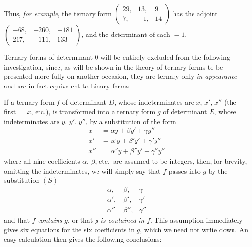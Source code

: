 Thus, \textit{for example}, the ternary form $\left(\begin{smallmatrix}29,\allowbreak &13,\allowbreak &9\\7,\allowbreak &-1,\allowbreak &14\end{smallmatrix}\right)$ has the adjoint $\left(\begin{smallmatrix}-68,\allowbreak &-260,\allowbreak &-181\\217,\allowbreak &-111,\allowbreak &133\end{smallmatrix}\right)$, and the determinant of each $=1$.

Ternary forms of determinant $0$ will be entirely excluded from the following investigation, since, as will be shown in the theory of ternary forms to be presented more fully on another occasion, they are ternary only \textit{in appearance} and are in fact equivalent to binary forms.

If a ternary form $f$ of determinant $D$, whose indeterminates are $x$, $x'$, $x''$ (the first $=x$, etc.), is transformed into a ternary form $g$ of determinant $E$, whose indeterminates are $y$, $y'$, $y''$, by a substitution of the form
\[
\begin{aligned}
x&=\alpha y+\beta y'+\gamma y'' \\
x'&=\alpha'y+\beta'y'+\gamma'y'' \\
x''&=\alpha''y+\beta''y'+\gamma''y''
\end{aligned}
\]
where all nine coefficients $\alpha$, $\beta$, etc.\ are assumed to be integers, then, for brevity, omitting the indeterminates, we will simply say that $f$ passes into $g$ by the substitution
$(S)$
\[
\begin{array}{ccc}
\alpha, & \beta, & \gamma \\
\alpha', & \beta', & \gamma' \\
\alpha'', & \beta'', & \gamma''
\end{array}
\]
and that $f$ \textit{contains} $g$, or that $g$ \textit{is contained in $f$}. This assumption immediately gives six equations for the six coefficients in $g$, which we need not write down. An easy calculation then gives the following conclusions:

